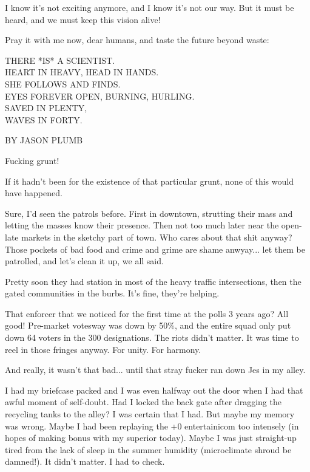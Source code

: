 \documentclass{amsbook}
\begin{document}
I know it's not exciting anymore, and I know it's not our way.  But it must be heard, and we must keep this vision alive!

Pray it with me now, dear humans, and taste the future beyond waste:

THERE *IS* A SCIENTIST.  \\
HEART IN HEAVY, HEAD IN HANDS.  \\
SHE FOLLOWS AND FINDS.  \\
EYES FOREVER OPEN, BURNING, HURLING.\\
SAVED IN PLENTY,\\
WAVES IN FORTY.\\

\clearpage

{\ROBOFONTx BY JASON PLUMB}
\vskip 36pt

Fucking grunt!

If it hadn't been for the existence of that particular grunt, none of this would have happened.

Sure, I'd seen the patrols before.  First in downtown, strutting their mass and letting the masses know their presence.  Then not too much later near the open-late markets in the sketchy part of town.  Who cares about that shit anyway?  Those pockets of bad food and crime and grime are shame anwyay... let them be patrolled, and let's clean it up, we all said.

Pretty soon they had station in most of the heavy traffic intersections, then the gated communities in the burbs.  It's fine, they're helping.

That enforcer that we noticed for the first time at the polls 3 years
ago?  All good!  Pre-market votesway was down by 50\%, and the entire squad only put down 64 voters in the 300 designations.  The riots didn't matter.  It was time to reel in those fringes anyway.  For unity.  For harmony.

And really, it wasn't that bad... until that stray fucker ran down Jes in my alley.

I had my briefcase packed and I was even halfway out the door when I had that awful moment of self-doubt.  Had I locked the back gate after dragging the recycling tanks to the alley?  I was certain that I had.  But maybe my memory was wrong.  Maybe I had been replaying the +0 entertainicom too intensely (in hopes of making bonus with my superior today).  Maybe I was just straight-up tired from the lack of sleep in the summer humidity (microclimate shroud be damned!).  It didn't matter.  I had to check.
\end{document}
